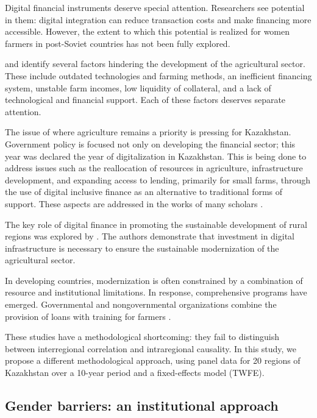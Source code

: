 ﻿\documentclass[pdflatex,sn-mathphys-ay]{sn-jnl}
\begin{document}
Digital financial instruments deserve special attention. Researchers see
potential in them: digital integration can reduce transaction costs and
make financing more accessible. However, the extent to which this
potential is realized for women farmers in post-Soviet countries has not
been fully explored.

\citet{ref63} and \citet{ref76} identify several factors
hindering the development of the agricultural sector. These include
outdated technologies and farming methods, an inefficient financing
system, unstable farm incomes, low liquidity of collateral, and a lack
of technological and financial support. Each of these factors deserves
separate attention.

The issue of where agriculture remains a priority is pressing for
Kazakhstan. Government policy is focused not only on developing the
financial sector; this year was declared the year of digitalization in
Kazakhstan. This is being done to address issues such as the
reallocation of resources in agriculture, infrastructure development,
and expanding access to lending, primarily for small farms, through the
use of digital inclusive finance as an alternative to traditional forms
of support. These aspects are addressed in the works of many scholars
\citep{ref56,ref80}.

The key role of digital finance in promoting the sustainable development
of rural regions was explored by \citet{ref87}.
The authors demonstrate that investment in digital infrastructure is
necessary to ensure the sustainable modernization of the agricultural
sector.

In developing countries, modernization is often constrained by a
combination of resource and institutional limitations. In response,
comprehensive programs have emerged. Governmental and nongovernmental
organizations combine the provision of loans with training for farmers
\citep{ref74,ref13,ref73}.

These studies have a methodological shortcoming: they fail to
distinguish between interregional correlation and intraregional
causality. In this study, we propose a different methodological
approach, using panel data for 20 regions of Kazakhstan over a 10-year
period and a fixed-effects model (TWFE).

\subsection{Gender barriers: an institutional approach}
\end{document}
